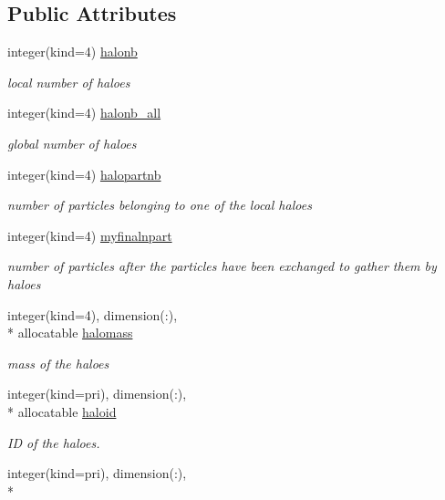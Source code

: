 \subsection*{Public Attributes}
\begin{DoxyCompactItemize}
\item 
integer(kind=4) \hyperlink{classmodhalo_a7a64076c8448a822872da06cfb3e98f6}{halonb}
\begin{DoxyCompactList}\small\item\em local number of haloes \end{DoxyCompactList}\item 
integer(kind=4) \hyperlink{classmodhalo_a8e5ab9d4d7316b9c26af34ac45a088ef}{halonb\-\_\-all}
\begin{DoxyCompactList}\small\item\em global number of haloes \end{DoxyCompactList}\item 
integer(kind=4) \hyperlink{classmodhalo_a026b99d5d7dc52fa2755b516c9947514}{halopartnb}
\begin{DoxyCompactList}\small\item\em number of particles belonging to one of the local haloes \end{DoxyCompactList}\item 
integer(kind=4) \hyperlink{classmodhalo_a52f1f25dcc26f652f137e54813e02309}{myfinalnpart}
\begin{DoxyCompactList}\small\item\em number of particles after the particles have been exchanged to gather them by haloes \end{DoxyCompactList}\item 
integer(kind=4), dimension(\-:), \\*
allocatable \hyperlink{classmodhalo_a22da1dc93c68210ac3c692f1fb545bc0}{halomass}
\begin{DoxyCompactList}\small\item\em mass of the haloes \end{DoxyCompactList}\item 
integer(kind=pri), dimension(\-:), \\*
allocatable \hyperlink{classmodhalo_a28d1d14569d3cd370d375aca76fd838c}{haloid}
\begin{DoxyCompactList}\small\item\em I\-D of the haloes. \end{DoxyCompactList}\item 
integer(kind=pri), dimension(\-:), \\*

\end{DoxyCompactItemize}
